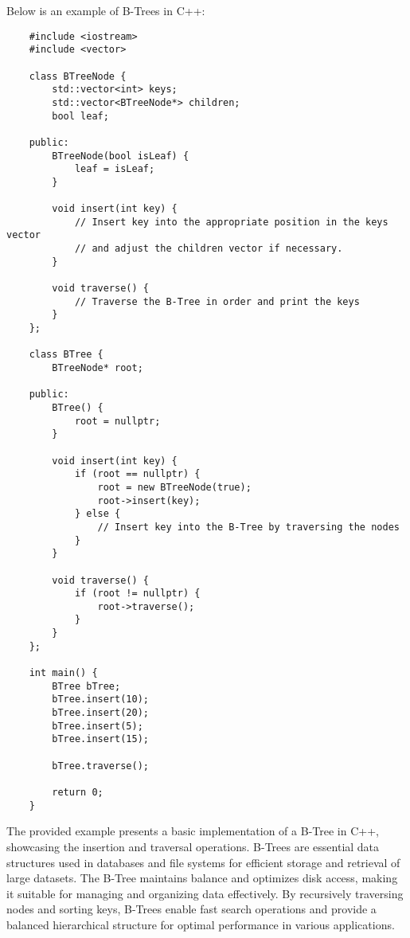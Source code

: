 \begin{solution}
    Below is an example of B-Trees in C++:

    \horizontalline

    \begin{verbatim}
    #include <iostream>
    #include <vector>
    
    class BTreeNode {
        std::vector<int> keys;
        std::vector<BTreeNode*> children;
        bool leaf;
    
    public:
        BTreeNode(bool isLeaf) {
            leaf = isLeaf;
        }
    
        void insert(int key) {
            // Insert key into the appropriate position in the keys vector
            // and adjust the children vector if necessary.
        }
    
        void traverse() {
            // Traverse the B-Tree in order and print the keys
        }
    };
    
    class BTree {
        BTreeNode* root;
    
    public:
        BTree() {
            root = nullptr;
        }
    
        void insert(int key) {
            if (root == nullptr) {
                root = new BTreeNode(true);
                root->insert(key);
            } else {
                // Insert key into the B-Tree by traversing the nodes
            }
        }
    
        void traverse() {
            if (root != nullptr) {
                root->traverse();
            }
        }
    };
    
    int main() {
        BTree bTree;
        bTree.insert(10);
        bTree.insert(20);
        bTree.insert(5);
        bTree.insert(15);
    
        bTree.traverse();
    
        return 0;
    }
    \end{verbatim}

    \horizontalline

    The provided example presents a basic implementation of a B-Tree in C++, showcasing the insertion and traversal operations. B-Trees are essential data structures used in databases and file systems for efficient storage and retrieval of large datasets. The B-Tree maintains balance and optimizes disk access, making it suitable for managing 
    and organizing data effectively. By recursively traversing nodes and sorting keys, B-Trees enable fast search operations and provide a balanced hierarchical structure for optimal performance in various applications.
\end{solution}

